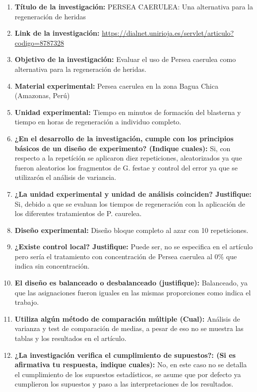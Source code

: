 \begin{enumerate}
	\item \textbf{Título de la investigación:} PERSEA CAERULEA: Una alternativa para la regeneración de heridas
	\item \textbf{Link de la investigación:} \url{https://dialnet.unirioja.es/servlet/articulo?codigo=8787328}
	\item \textbf{Objetivo de la investigación:} Evaluar el uso de Persea caerulea como alternativa para la regeneración de heridas.
	\item \textbf{Material experimental:} Persea caerulea en la zona Bagua Chica (Amazonas, Perú)
	\item \textbf{Unidad experimental:} Tiempo en minutos de formación del blasterna y tiempo en horas de regeneración a individuo completo.
	\item \textbf{¿En el desarrollo de la investigación, cumple con los principios básicos de un diseño de experimento? (Indique cuales):} Si, con respecto a la repetíción se aplicaron diez repeticiones, aleatorizados ya que fueron aleatorios los fragmentos de G. festae y control del error ya que se utilizarón el análisis de variancia.
	\item \textbf{¿La unidad experimental y unidad de análisis coinciden? Justifique:} Si, debido a que se evaluan los tiempos de regeneración con la aplicación de los diferentes tratamientos de P. caurelea.
	\item \textbf{Diseño experimental:} Diseño bloque completo al azar con 10 repeticiones.
	\item \textbf{¿Existe control local? Justifique:} Puede ser, no se especifica en el artículo pero sería el tratamiento con concentración de Persea caerulea al $0\%$ que indica sin concentración.
	\item \textbf{El diseño es balanceado o desbalanceado (justifique):} Balanceado, ya que las asignaciones fueron iguales en las mismas proporciones como indica el trabajo.
	\item \textbf{Utiliza algún método de comparación múltiple (Cual):} Análisis de varianza y test de comparación de medias, a pesar de eso no se muestra las tablas y los resultados en el artículo.
	\item \textbf{¿La investigación verifica el cumplimiento de supuestos?: (Si es afirmativa tu respuesta, indique cuales):} No, en este caso no se detalla el cumplimiento de los supuestos estadísticos, se asume que por defecto ya cumplieron los supuestos y paso a las interpretaciones de los resultados.
\end{enumerate}